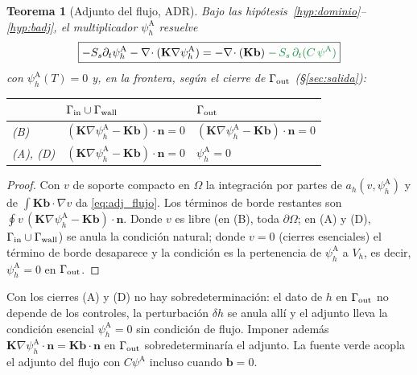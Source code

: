 \documentclass[11pt]{article}
\numberwithin{equation}{section}
\theoremstyle{plain}
\newtheorem{theorem}{Teorema}[section]
\theoremstyle{definition}
\theoremstyle{remark}
\newcommand{\bK}{\mathbf{K}}
\newcommand{\bn}{\mathbf{n}}
\newcommand{\bb}{\mathbf{b}}
\newcommand{\pA}{\psi^{\mathrm A}}          %
\newcommand{\phA}{\psi_h^{\mathrm A}}       %
\newcommand{\alm}[1]{{\color{cAlm}#1}}
\begin{document}
\begin{theorem}[Adjunto del flujo, ADR]\label{thm:adj_flujo}
Bajo las hipótesis~\ref{hyp:dominio}--\ref{hyp:badj}, el multiplicador $\phA$ resuelve
\begin{equation}
\boxed{-S_s\partial_t\phA-\nabla\!\cdot(\bK\nabla\phA)
=-\nabla\!\cdot(\bK\bb)\;\alm{-\,S_s\,\partial_t(C\,\pA)}}
\label{eq:adj_flujo}
\end{equation}
con $\phA(T)=0$ y, en la frontera, según el cierre de $\Gamma_{\rm out}$ (\S\ref{sec:salida}):
\begin{center}\small
\begin{tabular}{lll}
\toprule
 & $\Gamma_{\rm in}\cup\Gamma_{\rm wall}$ & $\Gamma_{\rm out}$ \\
\midrule
(B) & $(\bK\nabla\phA-\bK\bb)\cdot\bn=0$ & $(\bK\nabla\phA-\bK\bb)\cdot\bn=0$ \\
(A), (D) & $(\bK\nabla\phA-\bK\bb)\cdot\bn=0$ & $\phA=0$ \\
\bottomrule
\end{tabular}
\end{center}
\end{theorem}
\begin{proof}
Con $v$ de soporte compacto en $\Omega$ la integración por partes de $a_h(v,\phA)$ y de $\int\bK\bb\cdot\nabla v$ da \eqref{eq:adj_flujo}. Los términos de borde restantes son
$\oint v\,(\bK\nabla\phA-\bK\bb)\cdot\bn$. Donde $v$ es libre (en (B), toda $\partial\Omega$; en (A) y (D), $\Gamma_{\rm in}\cup\Gamma_{\rm wall}$) se anula la condición natural; donde $v=0$ (cierres esenciales) el
término de borde desaparece y la condición es la pertenencia de $\phA$ a $V_h$, es decir, $\phA=0$ en $\Gamma_{\rm out}$.
\end{proof}
Con los cierres (A) y (D) no hay sobredeterminación: el dato de $h$ en $\Gamma_{\rm out}$ no depende de los controles, la perturbación $\delta h$ se anula allí y el adjunto lleva la condición esencial $\phA=0$ sin condición de flujo.
Imponer además $\bK\nabla\phA\cdot\bn=\bK\bb\cdot\bn$ en $\Gamma_{\rm out}$ sobredeterminaría el adjunto.
La fuente verde acopla el adjunto del flujo con $C\pA$ incluso cuando $\bb=0$.
\end{document}
